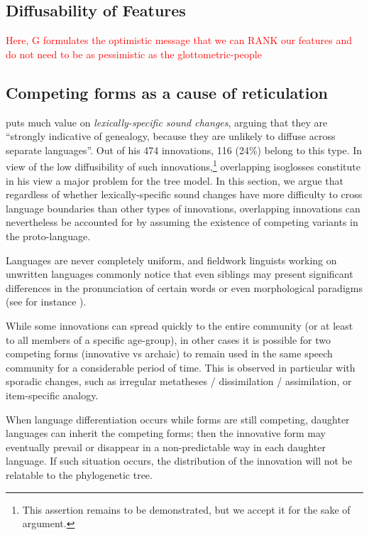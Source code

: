 \documentclass[svgnames,12pt]{scrartcl}
\newcommand\Comment[1]{\textcolor{red}{#1}}
\begin{document}
{{\subsection{Diffusability of Features}
\Comment{Here, G formulates the optimistic message that we can RANK our features and do not need to
be as pessimistic as the glottometric-people}

\subsection{Competing forms as a  cause of reticulation}
\citet[178]{Francois2015} puts much value on \textit{lexically-specific sound changes}, arguing that they are ``strongly indicative of genealogy, because they are unlikely to diffuse across separate languages''. Out of his 474 innovations, 116 (24\%) belong to this type. In view of the low diffusibility of such innovations,\footnote{This assertion remains to be demonstrated, but we accept it for the sake of argument.} overlapping isoglosses constitute in his view a major problem for the tree model. In this section, we argue that regardless of whether lexically-specific sound changes have more difficulty to cross language boundaries than other types of innovations, overlapping innovations can nevertheless be accounted for by assuming the existence of competing variants in the proto-language.

Languages are never completely uniform, and fieldwork linguists working on unwritten languages commonly notice that even siblings may present significant differences in the pronunciation of certain words or even morphological paradigms (see for instance \citealt[29-30]{genetti07grammar}). 

While some innovations can spread quickly to the entire community (or at least to all members of a specific age-group), in other cases it is possible for two competing forms (innovative vs archaic) to remain used in the same  speech community for a considerable period of time. This is observed in particular with sporadic changes, such as irregular metatheses / dissimilation / assimilation, or item-specific analogy.

When language differentiation occurs while forms are still competing, daughter languages can inherit the competing forms; then the innovative form may eventually prevail or disappear in a non-predictable way in each daughter language. If such situation occurs, the distribution of the innovation will not be relatable to the phylogenetic tree.

}}
\end{document}
